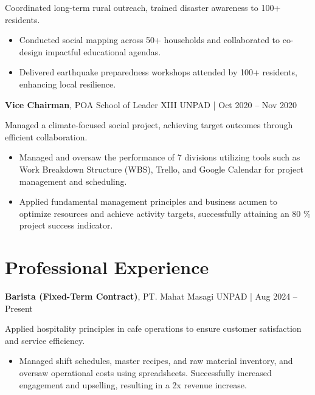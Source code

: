\documentclass[10pt,a4paper]{article}
\begin{document}
Coordinated long-term rural outreach, trained disaster awareness to 100+ residents.
\begin{itemize}[left=1.5em, noitemsep, topsep=0pt]
  \item Conducted social mapping across 50+ households and collaborated to co-design impactful educational agendas.
  \item Delivered earthquake preparedness workshops attended by 100+ residents, enhancing local resilience.
\end{itemize}

\vspace{0.5em}

\setlength{\fboxsep}{0pt}
\colorbox[HTML]{E6F8DC}{%
\parbox{\linewidth}{%
\textbf{Vice Chairman}, POA School of Leader XIII UNPAD \quad | \quad Oct 2020 – Nov 2020
}%
}

Managed a climate-focused social project, achieving target outcomes through efficient collaboration.

\begin{itemize}[left=1.5em, noitemsep, topsep=0pt]
\item Managed and oversaw the performance of 7 divisions utilizing tools such as Work Breakdown Structure (WBS), Trello, and Google Calendar for project management and scheduling.
\item Applied fundamental management principles and business acumen to optimize resources and achieve activity targets, successfully attaining an 80 \% project success indicator.
\end{itemize}

\section*{Professional Experience}

\setlength{\fboxsep}{0pt}
\colorbox[HTML]{E6F8DC}{%
  \parbox{\linewidth}{%
    \textbf{Barista (Fixed-Term Contract)}, PT. Mahat Masagi UNPAD \quad | \quad Aug 2024 – Present
  }%
}

Applied hospitality principles in cafe operations to ensure customer satisfaction and service efficiency.

\begin{itemize}[left=1.5em, noitemsep, topsep=0pt]
    \item Managed shift schedules, master recipes, and raw material inventory, and oversaw operational costs using spreadsheets. Successfully increased engagement and upselling, resulting in a 2x revenue increase.
\end{itemize}
\end{document}
